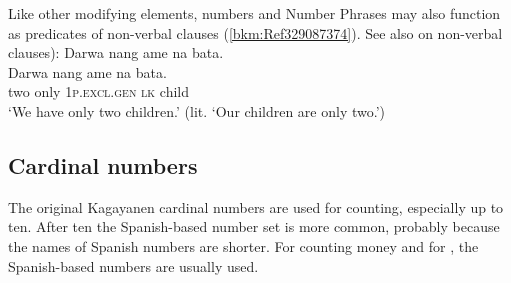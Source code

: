 Like other modifying elements, numbers and Number Phrases may also function as predicates of non-verbal clauses (\ref{bkm:Ref329087374}). See also  on non-verbal clauses):
\ea
\label{bkm:Ref329087374}
Darwa  nang  ame   na  bata. \\\smallskip
 \gll Darwa  nang  ame   na  bata. \\
two  only  1\textsc{p.excl.gen}  \textsc{lk}  child \\
\glt ‘We have only two children.’ (lit. ‘Our children are only two.’)
\z
\subsection{Cardinal numbers}
\label{bkm:Ref479572983}

The original Kagayanen cardinal numbers are used for counting, especially up to ten. After ten the Spanish-based number set is more common, probably because the names of Spanish numbers are shorter. For counting money and for , the Spanish-based numbers are usually used.
\ea
